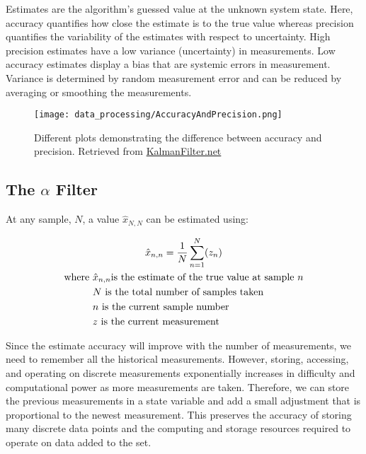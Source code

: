         Estimates are the algorithm's guessed value at the unknown system state.
        Here, accuracy quantifies how close the estimate is to the true value whereas precision quantifies the variability of the estimates with respect to uncertainty.
        High precision estimates have a low variance (uncertainty) in measurements.
        Low accuracy estimates display a bias that are systemic errors in measurement.
        Variance is determined by random measurement error and can be reduced by averaging or smoothing the measurements.

        \begin{figure*}[h!]
            \texttt{[image: data\_processing/AccuracyAndPrecision.png]}
            \caption[Accuracy and Precision]{Different plots demonstrating the difference between accuracy and precision.
            Retrieved from \href{https://www.kalmanfilter.net/img/BB1/AccuracyAndPrecision.png}{KalmanFilter.net}}
        \end{figure*}

        \subsection{The $\alpha$ Filter} 
        At any sample, $N$, a value $\hat{x}_{N,N}$ can be estimated using:
        
        \begin{gather*} \labeq{sample_estimate}
            \hat{x}_{n,n} = \frac{1}{N} \sum_{n=1}^{N} (z_n) \\
            \begin{aligned}
                \text{where } &\hat{x}_{n,n} \text{is the estimate of the true value at sample $n$} \\
                &N \text{ is the total number of samples taken} \\
                &n \text{ is the current sample number} \\
                &z \text{ is the current measurement} \\
            \end{aligned} \notag
        \end{gather*}

        Since the estimate accuracy will improve with the number of measurements, we need to remember all the historical measurements.
        However, storing, accessing, and operating on discrete measurements exponentially increases in difficulty and computational power as more measurements are taken.
        Therefore, we can store the previous measurements in a state variable and add a small adjustment that is proportional to the newest measurement.
        This preserves the accuracy of storing many discrete data points and the computing and storage resources required to operate on data added to the set.

